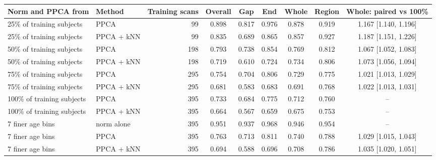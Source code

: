 \begin{tabular}{llrcccccc}
\toprule
Norm and PPCA from & Method & Training scans & Overall & Gap & End & Whole & Region & Whole: paired vs 100\% \\
\midrule
25\% of training subjects & PPCA & 99 & 0.898 & 0.817 & 0.976 & 0.878 & 0.919 & 1.167 [1.140, 1.196] \\
25\% of training subjects & PPCA + kNN & 99 & 0.835 & 0.689 & 0.865 & 0.857 & 0.927 & 1.187 [1.151, 1.226] \\
50\% of training subjects & PPCA & 198 & 0.793 & 0.738 & 0.854 & 0.769 & 0.812 & 1.067 [1.052, 1.083] \\
50\% of training subjects & PPCA + kNN & 198 & 0.719 & 0.610 & 0.724 & 0.734 & 0.806 & 1.073 [1.056, 1.094] \\
75\% of training subjects & PPCA & 295 & 0.754 & 0.704 & 0.806 & 0.729 & 0.775 & 1.021 [1.013, 1.029] \\
75\% of training subjects & PPCA + kNN & 295 & 0.681 & 0.583 & 0.683 & 0.691 & 0.768 & 1.022 [1.013, 1.031] \\
100\% of training subjects & PPCA & 395 & 0.733 & 0.684 & 0.775 & 0.712 & 0.760 & -- \\
100\% of training subjects & PPCA + kNN & 395 & 0.664 & 0.567 & 0.659 & 0.675 & 0.753 & -- \\
7 finer age bins & norm alone & 395 & 0.951 & 0.937 & 0.968 & 0.946 & 0.954 & -- \\
7 finer age bins & PPCA & 395 & 0.763 & 0.713 & 0.811 & 0.740 & 0.788 & 1.029 [1.015, 1.043] \\
7 finer age bins & PPCA + kNN & 395 & 0.694 & 0.588 & 0.696 & 0.708 & 0.786 & 1.035 [1.020, 1.051] \\
\bottomrule
\end{tabular}
